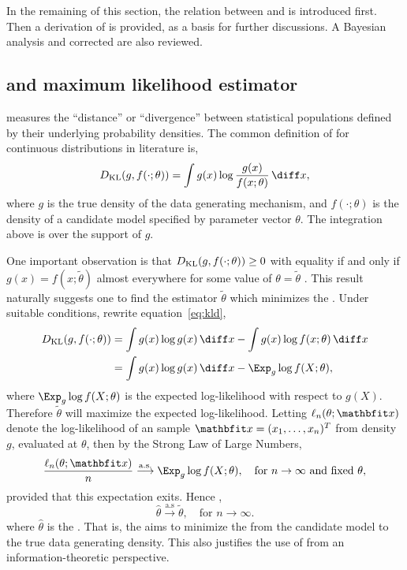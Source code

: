 In the remaining of this section, the relation between \kl and \mle is
introduced first. Then a derivation of \aic is provided, as a basis for
further discussions. A Bayesian analysis and corrected \aic are also reviewed.

\subsection{\protect\kl and maximum likelihood estimator}
\label{sub:kl and maximum likelihood estimator}

\kl measures the ``distance'' or ``divergence'' between statistical
populations defined by their underlying probability densities. The common
definition of \kl for continuous distributions in literature is,
\begin{equation}
  \dkl(g, f(\cdot;\theta)) = \int g(x)\log\frac{g(x)}{f(x;\theta)}\intd x,
  \label{eq:kld}
\end{equation}
where $g$ is the true density of the data generating mechanism, and
$f(\cdot;\theta)$ is the density of a candidate model specified by parameter
vector $\theta$. The integration above is over the support of $g$.

One important observation is that $D_{\mathrm{KL}}(g,f(\cdot;\theta))\ge0$ with equality if
and only if $g(x) = f(x;\tilde\theta)$ almost everywhere for some value of $\theta =
\tilde\theta$ \cite{Kullback:1951va}. This result naturally suggests one to find
the estimator $\tilde\theta$ which minimizes the \kl. Under suitable conditions,
rewrite equation~\eqref{eq:kld},
\begin{align}
  \dkl(g,f(\cdot;\theta))
  & = \int g(x)\log g(x)\intd x - \int g(x)\log f(x;\theta)\intd x \notag\\
  & = \int g(x)\log g(x)\intd x - \Exp_g \log f(X;\theta),
  \label{eq:kl exp ll}
\end{align}
where $\Exp_g\log f(X;\theta)$ is the expected log-likelihood with respect to
$g(X)$. Therefore $\tilde\theta$ will maximize the expected log-likelihood. Letting
$\ell_n(\theta;\bfx)$ denote the log-likelihood of an \iid sample $\bfx =
(x_1,\dots,x_n)^T$ from density $g$, evaluated at $\theta$, then by the Strong
Law of Large Numbers,
\begin{equation}
  \frac{\ell_n(\theta;\bfx)}{n}
  \overset{\mathrm{a.s.}}{\longrightarrow}
  \Exp_g\log f(X;\theta), \quad\text{for } n\to\infty\text{ and fixed }\theta,
  \label{eq:kl consistency}
\end{equation}
provided that this expectation exits. Hence \cite[see][for
details]{Kullback:1951va},
\begin{equation}
  \hat\theta \overset{\mathrm{a.s}}{\longrightarrow} \tilde\theta,
  \quad\text{for } n\to\infty.
\end{equation}
where $\hat\theta$ is the \mle. That is, the \mle aims to minimize the \kl from the
candidate model to the true data generating density. This also justifies the
use of \mle from an information-theoretic perspective.

